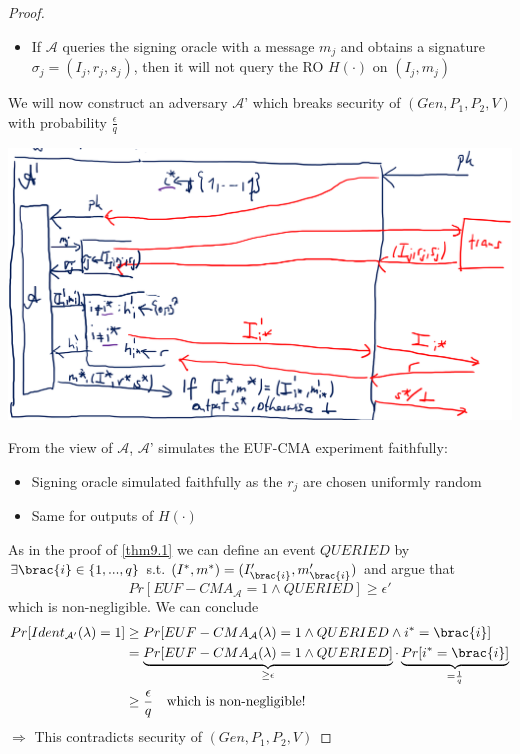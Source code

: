 \begin{proof}
\begin{itemize}
\begin{itemize}
                \item If $\mathcal{A}$ queries the signing oracle with a message $m_j$ and obtains a signature $\sigma_j = (I_j,r_j,s_j)$, 
                then it will not query the RO $H(\cdot)$ on $(I_j,m_j)$
            \end{itemize}
        \end{itemize}
        We will now construct an adversary $\mathcal{A}$' which breaks security of $(Gen,P_1,P_2,V)$ with probability $\frac{\epsilon}{q}$
        \begin{center}
            \includegraphics[width=160mm]{Graphics/Digital Signatures/fst3.png}
        \end{center}
        From the view of $\mathcal{A}$, $\mathcal{A}$' simulates the EUF-CMA experiment faithfully:
        \begin{itemize}
            \item Signing oracle simulated faithfully as the $r_j$ are chosen uniformly random
            \item Same for outputs of $H(\cdot)$
        \end{itemize}
        As in the proof of \cref{thm9.1} we can define an event $QUERIED$ by $\exists \brac{i} \in \{1,...,q\}$ s.t. $(I^*,m^*) = (I'_{\brac{i}},m'_{\brac{i}})$
        and argue that 
        $$Pr[EUF-CMA_{\mathcal{A}}=1 \wedge QUERIED] \geq \epsilon'$$
        which is non-negligible. We can conclude
        \begin{align*}
            Pr[Ident_{\mathcal{A}'}(\lambda)=1] &\geq Pr[EUF-CMA_{\mathcal{A}}(\lambda)=1 \wedge QUERIED \wedge i^*=\brac{i}]\\
            &= \underbrace{Pr[EUF-CMA_{\mathcal{A}}(\lambda)=1 \wedge QUERIED]}_{\geq \epsilon} \cdot \underbrace{Pr[i^*=\brac{i}]}_{= \frac{1}{q}}\\
            &\geq \frac{\epsilon}{q}\ \ \ \text{which is non-negligible!}
        \end{align*}
        $\Rightarrow$ This contradicts security of $(Gen,P_1,P_2,V)$
    \end{proof}
    
